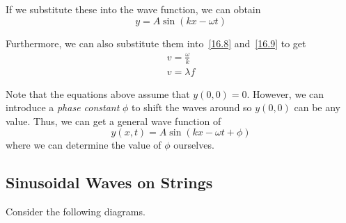 If we substitute these into the wave function, we can obtain
\begin{equation}\label{16.10}
    y = A\sin(kx - \omega t)
\end{equation}

Furthermore, we can also substitute them into~\eqref{16.8} and~\eqref{16.9} to get
\begin{eqnarray}
    v = \frac{\omega}{k}\label{16.11}\\
    v = \lambda f\label{16.12}
\end{eqnarray}

Note that the equations above assume that $y(0, 0) = 0$. However, we can introduce a \textit{phase
constant} $\phi$ to shift the waves around so $y(0, 0)$ can be any value. Thus, we can get a general
wave function of
\begin{equation}\label{16.13}
    y(x, t) = A\sin(kx - \omega t + \phi)
\end{equation}
where we can determine the value of $\phi$ ourselves.

\subsection{Sinusoidal Waves on Strings}

Consider the following diagrams.

